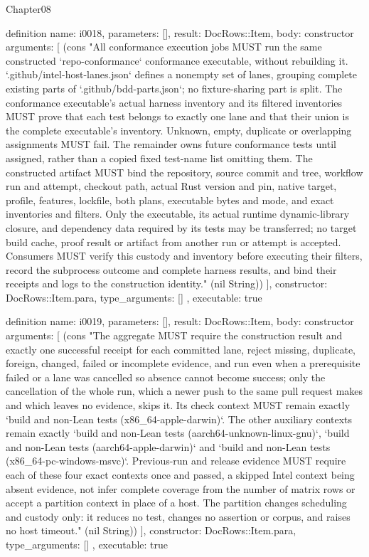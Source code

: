 \begin{lexlean}{Chapter08}
\begin{semanticmodule}
definition{
  name: i0018,
  parameters: [],
  result: DocRows::Item,
  body: constructor{
    arguments: [
      (cons "All conformance execution jobs MUST run the same constructed `repo-conformance` conformance executable, without rebuilding it. `.github/intel-host-lanes.json` defines a nonempty set of lanes, grouping complete existing parts of `.github/bdd-parts.json`; no fixture-sharing part is split. The conformance executable's actual harness inventory and its filtered inventories MUST prove that each test belongs to exactly one lane and that their union is the complete executable's inventory. Unknown, empty, duplicate or overlapping assignments MUST fail. The remainder owns future conformance tests until assigned, rather than a copied fixed test-name list omitting them. The constructed artifact MUST bind the repository, source commit and tree, workflow run and attempt, checkout path, actual Rust version and pin, native target, profile, features, lockfile, both plans, executable bytes and mode, and exact inventories and filters. Only the executable, its actual runtime dynamic-library closure, and dependency data required by its tests may be transferred; no target build cache, proof result or artifact from another run or attempt is accepted. Consumers MUST verify this custody and inventory before executing their filters, record the subprocess outcome and complete harness results, and bind their receipts and logs to the construction identity." (nil String))
    ],
    constructor: DocRows::Item.para,
    type_arguments: []
  },
  executable: true
}

definition{
  name: i0019,
  parameters: [],
  result: DocRows::Item,
  body: constructor{
    arguments: [
      (cons "The aggregate MUST require the construction result and exactly one successful receipt for each committed lane, reject missing, duplicate, foreign, changed, failed or incomplete evidence, and run even when a prerequisite failed or a lane was cancelled so absence cannot become success; only the cancellation of the whole run, which a newer push to the same pull request makes and which leaves no evidence, skips it. Its check context MUST remain exactly `build and non-Lean tests (x86_64-apple-darwin)`. The other auxiliary contexts remain exactly `build and non-Lean tests (aarch64-unknown-linux-gnu)`, `build and non-Lean tests (aarch64-apple-darwin)` and `build and non-Lean tests (x86_64-pc-windows-msvc)`. Previous-run and release evidence MUST require each of these four exact contexts once and passed, a skipped Intel context being absent evidence, not infer complete coverage from the number of matrix rows or accept a partition context in place of a host. The partition changes scheduling and custody only: it reduces no test, changes no assertion or corpus, and raises no host timeout." (nil String))
    ],
    constructor: DocRows::Item.para,
    type_arguments: []
  },
  executable: true
}


\end{semanticmodule}
\end{lexlean}
